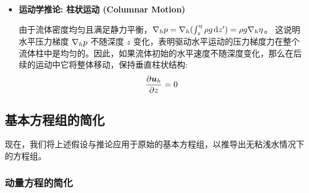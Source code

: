 \begin{itemize}
\begin{proofbox}[尺度分析]
\begin{itemize}
            因此，在浅水近似下我们可以合理地忽略垂直加速度。
        \end{itemize}
    \end{proofbox}

    \item \textbf{运动学推论: 柱状运动 (Columnar Motion)}

    由于流体密度均匀且满足静力平衡，$\nabla_h p = \nabla_h (\int_z^\eta \rho g \mkern2mu \mathrm{d} z^\prime) = \rho g \nabla_h \eta$。
    这说明水平压力梯度 $\nabla_h p$ 不随深度 $z$ 变化，表明驱动水平运动的压力梯度力在整个流体柱中是均匀的。因此，如果流体初始的水平速度不随深度变化，那么在后续的运动中它将整体移动，保持垂直柱状结构:
    \begin{equation}
        \pde{\vel_h}{z} = 0
        \label{eq:columnar_motion}
    \end{equation}
\end{itemize}

\subsection{基本方程组的简化}

现在，我们将上述假设与推论应用于原始的基本方程组，以推导出无粘浅水情况下的方程组。

\subsubsection{动量方程的简化}

